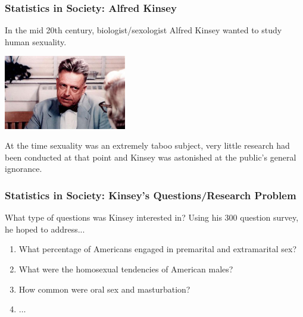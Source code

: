 \documentclass[handout]{beamer}
\begin{document}
\begin{frame}
\frametitle{Statistics in Society: Alfred Kinsey}
In the mid 20th century, biologist/sexologist Alfred Kinsey wanted to study human sexuality.

\begin{center}
\includegraphics[width=0.4\textwidth]{./figure/alfred-kinsey.jpg}
\end{center}

\pause At the time sexuality was an extremely taboo subject, very little research had been conducted at that point and Kinsey was astonished at the public's general ignorance.

\end{frame}



\begin{frame}
\frametitle{Statistics in Society: Kinsey's Questions/Research Problem}
What type of questions was Kinsey interested in?  Using his 300 question survey, he hoped to address...

\begin{enumerate}
\pause \item What percentage of Americans engaged in premarital and extramarital sex?
\pause \item What were the homosexual tendencies of American males?
\pause \item How common were oral sex and masturbation?
\item $\ldots$
\end{enumerate}
\end{frame}
\end{document}

